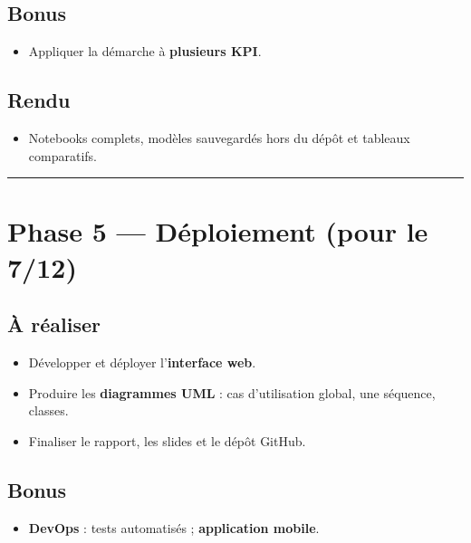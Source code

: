 \documentclass[11pt,a4paper]{article}
\providecommand{\tightlist}{\setlength{\itemsep}{0pt}\setlength{\parskip}{0pt}}
\begin{document}
\subsection{Bonus}\label{bonus-3}

\begin{itemize}
\tightlist
\item
  Appliquer la démarche à \textbf{plusieurs KPI}.
\end{itemize}

\subsection{Rendu}\label{rendu-3}

\begin{itemize}
\tightlist
\item
  Notebooks complets, modèles sauvegardés hors du dépôt et tableaux
  comparatifs.
\end{itemize}

\begin{center}\rule{0.5\linewidth}{0.5pt}\end{center}

\section{Phase 5 --- Déploiement (pour le
7/12)}\label{phase-5-duxe9ploiement-pour-le-712}

\subsection{À réaliser}\label{uxe0-ruxe9aliser-4}

\begin{itemize}
\tightlist
\item
  Développer et déployer l'\textbf{interface web}.
\item
  Produire les \textbf{diagrammes UML} : cas d'utilisation global, une
  séquence, classes.
\item
  Finaliser le rapport, les slides et le dépôt GitHub.
\end{itemize}

\subsection{Bonus}\label{bonus-4}

\begin{itemize}
\tightlist
\item
  \textbf{DevOps} : tests automatisés ; \textbf{application mobile}.
\end{itemize}
\end{document}
